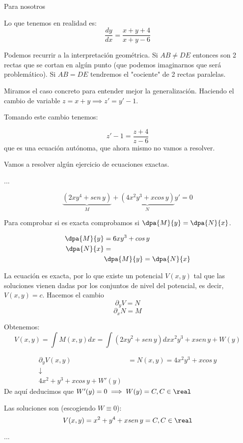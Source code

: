 \documentclass[nochap]{apuntes}
\begin{document}
\begin{problem}[7]
\ppart
\ppart 
\ppart

\solution
\spart Para nosotros

\spart
Lo que tenemos en realidad es: \[\frac{dy}{dx} = \frac{x+y+4}{x+y-6}\]

Podemos recurrir a la interpretación geométrica. Si $AB\neq DE$ entonces son 2 rectas que se cortan en algún punto (que podemos imaginarnos que será problemático). Si $AB=DE$ tendremos el "cociente" de 2 rectas paralelas. 

Miramos el caso concreto para entender mejor la  generalización. Haciendo el cambio de variable $z=
x+y \implies z'=y'-1$.

Tomando este cambio tenemos:

\[z'-1 = \frac{z+4}{z-6}\] que es una ecuación autónoma, que ahora mismo no vamos a resolver.

\end{problem}

Vamos a resolver algún ejercicio de ecuaciones exactas.

\begin{problem}[9]
\ppart
\ppart
\ppart
...
\solution

\spart
\spart
\spart
\[\underbrace{(2xy^4+sen\,y)}_{M} + \underbrace{(4x^2y^3 + xcos\,y)}_{N}y' = 0\]

Para comprobar si es exacta comprobamos si $\displaystyle\dpa{M}{y} = \dpa{N}{x}$.

\begin{align*}
\dpa{M}{y} &= 6xy^3 + cos\,y\\
\dpa{N}{x} &= \\
&\dpa{M}{y} = \dpa{N}{x}
\end{align*}

La ecuación es exacta, por lo que existe un potencial $V(x,y)$ tal que las soluciones vienen dadas por los conjuntos de nivel del potencial, es decir, $V(x,y) = c$. Hacemos el cambio \[\partial_yV=N\]\[\partial_xN=M\]

Obtenemos: \[V(x,y) = \int M(x,y) dx = \int (2xy^2+sen\,y)dx x^2y^3+xsen\,y + W(y)\]

\[\begin{array}{cc}
\partial_y V(x,y) &= N(x,y) = 4x^2y^3 + xcos\,y\\
\downarrow &\,\\
4x^2+y^3+xcos\,y + W'(y)
\end{array}\]
De aquí deducimos que $W'(y) = 0 \implies W(y) = C, C\in\real$

Las soluciones son (escogiendo $W\equiv 0$): 
\[V(x,y) = x^2+y^4+xsen\,y = C, C\in\real\]

\spart...
\end{problem}
\end{document}
